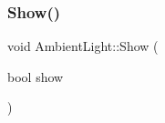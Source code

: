 \hypertarget{class_ambient_light_a18bb78895b77974c8d95abd05c0abba1}{}\label{class_ambient_light_a18bb78895b77974c8d95abd05c0abba1} 
\subsubsection{\texorpdfstring{Show()}{Show()}}
{\footnotesize\ttfamily void Ambient\+Light\+::\+Show (\begin{DoxyParamCaption}\item[{bool}]{show }\end{DoxyParamCaption})}

